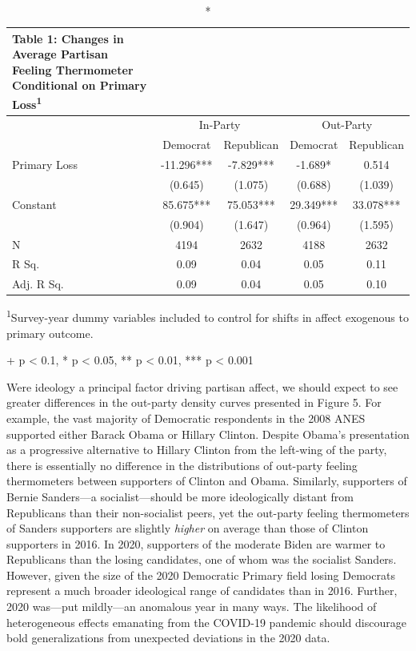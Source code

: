 \documentclass[
]{article}
\begin{document}
\clearpage
\captionsetup[table]{labelformat=empty,skip=1pt}
\begin{longtable}{lcccc}
\caption*{
{\large \textbf{Table 1:} Changes in Average Partisan Feeling Thermometer  Conditional on Primary Loss\textsuperscript{1}}
} \\ 
\toprule
 & \multicolumn{2}{c}{In-Party} & \multicolumn{2}{c}{Out-Party} \\ 
 \cmidrule(lr){2-3} \cmidrule(lr){4-5}
  & Democrat & Republican & Democrat  & Republican  \\ 
\midrule
Primary Loss & -11.296*** & -7.829*** & -1.689* & 0.514 \\ 
 & (0.645) & (1.075) & (0.688) & (1.039) \\ 
Constant & 85.675*** & 75.053*** & 29.349*** & 33.078*** \\ 
 & (0.904) & (1.647) & (0.964) & (1.595) \\ 
N & 4194 & 2632 & 4188 & 2632 \\ 
R Sq. & 0.09 & 0.04 & 0.05 & 0.11 \\ 
Adj. R Sq. & 0.09 & 0.04 & 0.05 & 0.10 \\ 
 \bottomrule
\end{longtable}
\vspace{-5mm}
\begin{minipage}{\linewidth}
\textsuperscript{1}Survey-year dummy variables included to  control for shifts in affect exogenous to primary outcome. \\ 
\end{minipage}
\begin{minipage}{\linewidth}
+ p < 0.1, * p < 0.05, ** p < 0.01, *** p < 0.001\\ 
\end{minipage}

Were ideology a principal factor driving partisan affect, we should expect to see greater differences in the out-party density curves presented in Figure 5. For example, the vast majority of Democratic respondents in the 2008 ANES supported either Barack Obama or Hillary Clinton. Despite Obama's presentation as a progressive alternative to Hillary Clinton from the left-wing of the party, there is essentially no difference in the distributions of out-party feeling thermometers between supporters of Clinton and Obama. Similarly, supporters of Bernie Sanders---a socialist---should be more ideologically distant from Republicans than their non-socialist peers, yet the out-party feeling thermometers of Sanders supporters are slightly \emph{higher} on average than those of Clinton supporters in 2016. In 2020, supporters of the moderate Biden are warmer to Republicans than the losing candidates, one of whom was the socialist Sanders. However, given the size of the 2020 Democratic Primary field losing Democrats represent a much broader ideological range of candidates than in 2016. Further, 2020 was---put mildly---an anomalous year in many ways. The likelihood of heterogeneous effects emanating from the COVID-19 pandemic should discourage bold generalizations from unexpected deviations in the 2020 data.
\end{document}
